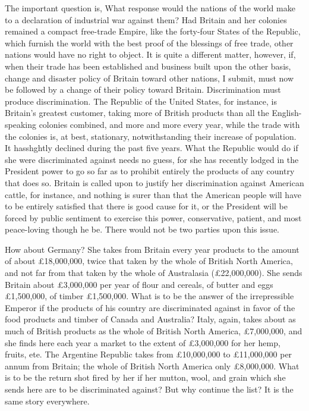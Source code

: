 \documentclass[11pt,openany]{book}
\begin{document}
The important question is, What response would the nations of the world make to a declaration of industrial war against them? Had Britain and her colonies remained a compact free-trade Empire, like the forty-four States of the Republic, which furnish the world with the best proof of the blessings of free trade, other nations would have no right to object. It is quite a different matter, however, if, when their trade has been established and business built upon the other basis, change and disaster policy of Britain toward other nations, I submit, must now be followed by a change of their policy toward Britain. Discrimination must produce discrimination. The Republic of the United States, for instance, is Britain's greatest customer, taking more of British products than all the English-speaking colonies combined, and more and more every year, while the trade with the colonies is, at best, stationary, notwithstanding their increase of population. It hasshghtly declined during the past five years. What the Republic would do if she were discriminated against needs no guess, for she has recently lodged in the President power to go so far as to prohibit entirely the products of any country that does so. Britain is called upon to justify her discrimination against American cattle, for instance, and nothing is surer than that the American people will have to be entirely satisfied that there is good cause for it, or the President will be forced by public sentiment to exercise this power, conservative, patient, and most peace-loving though he be. There would not be two parties upon this issue.

How about Germany? She takes from Britain every year products to the amount of about £18,000,000, twice that taken by the whole of British North America, and not far from that taken by the whole of Australasia (£22,000,000). She sends Britain about £3,000,000 per year of flour and cereals, of butter and eggs £1,500,000, of timber £1,500,000. What is to be the answer of the irrepressible Emperor if the products of his country are discriminated against in favor of the food products and timber of Canada and Australia? Italy, again, takes about as much of British products as the whole of British North America, £7,000,000, and she finds here each year a market to the extent of £3,000,000 for her hemp, fruits, ete. The Argentine Republic takes from £10,000,000 to £11,000,000 per annum from Britain; the whole of British North America only £8,000,000. What is to be the return shot fired by her if her mutton, wool, and grain which she sends here are to be discriminated against? But why continue the list? It is the same story everywhere.
\end{document}
